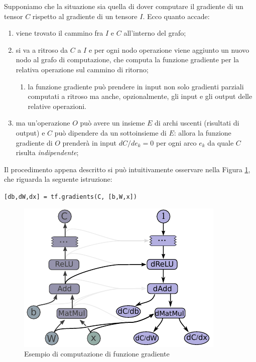\documentclass[DIV=calc, paper=a4, fontsize=11pt]{scrartcl}	 %
\begin{document}
\begin{multicols}{2}
			Supponiamo che la situazione sia quella di dover computare il gradiente di un tensor $C$ rispetto al gradiente di un tensore $I$. Ecco quanto accade:
			\begin{enumerate}
				\item viene trovato il cammino fra $I$ e $C$ all'interno del grafo;
				\item si va a ritroso da $C$ a $I$ e per ogni nodo operazione viene aggiunto un nuovo nodo al grafo di computazione, che computa la funzione gradiente per la relativa operazione sul cammino di ritorno;
				\begin{enumerate}
					\item la funzione gradiente può prendere in input non solo gradienti parziali computati a ritroso ma anche, opzionalmente, gli input e gli output delle relative operazioni.
				\end{enumerate}
				\item ma un'operazione $O$ può avere un insieme $E$ di archi uscenti (risultati di output) e $C$ può dipendere da un sottoinsieme di $E$: allora la funzione gradiente di $O$ prenderà in input $dC/de_k = 0$ per ogni arco $e_k$ da quale $C$ risulta \textit{indipendente};
			\end{enumerate}
			Il procedimento appena descritto si può intuitivamente osservare nella Figura \ref{fig:gradients}, che riguarda la seguente istruzione:
			\begin{center}
				\texttt{[db,dW,dx] = tf.gradients(C, [b,W,x])}
			\end{center}
			\begin{figure}[H]
				\centering
				\includegraphics[scale=.9]{img/gradients.png}
				\caption{Esempio di computazione di funzione gradiente}
				\label{fig:gradients}
			\end{figure}
		

\end{multicols}
\end{document}
